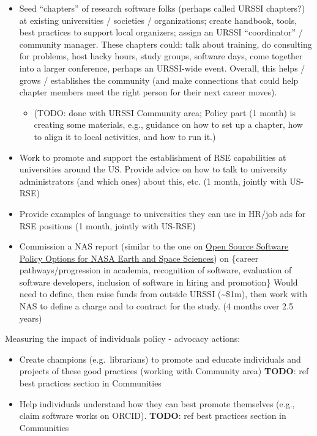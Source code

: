 \documentclass[
]{book}
\providecommand{\tightlist}{%
  \setlength{\itemsep}{0pt}\setlength{\parskip}{0pt}}
\begin{document}
\begin{itemize}
\item
  Seed ``chapters'' of research software folks (perhaps called URSSI chapters?) at existing
  universities / societies / organizations; create handbook, tools, best practices to support
  local organizers; assign an URSSI ``coordinator'' / community manager. These chapters could:
  talk about training, do consulting for problems, host hacky hours, study groups, software days,
  come together into a larger conference, perhaps an URSSI-wide event. Overall, this
  helps / grows / establishes the community (and make connections that could help chapter members
  meet the right person for their next career moves).

  \begin{itemize}
  \tightlist
  \item
    (TODO: done with URSSI Community area; Policy part (1 month) is creating some materials,
    e.g., guidance on how to set up a chapter, how to align it to local activities, and how to run it.)
  \end{itemize}
\item
  Work to promote and support the establishment of RSE capabilities at universities around the US.
  Provide advice on how to talk to university administrators (and which ones) about this, etc. (1 month,
  jointly with US-RSE)
\item
  Provide examples of language to universities they can use in HR/job ads for RSE positions
  (1 month, jointly with US-RSE)
\item
  Commission a NAS report (similar to the one on \href{https://www.nap.edu/read/25217/chapter/1}{Open Source Software Policy Options for NASA
  Earth and Space Sciences}) on
  \{career pathways/progression in academia, recognition of software, evaluation of software developers,
  inclusion of software in hiring and promotion\} Would need to define, then raise funds from
  outside URSSI (\textasciitilde\$1m), then work with NAS to define a charge and to contract for the study.
  (4 months over 2.5 years)
\end{itemize}

Measuring the impact of individuals policy - advocacy actions:

\begin{itemize}
\item
  Create champions (e.g.~librarians) to promote and educate individuals and projects of these
  good practices (working with Community area) \textbf{TODO}: ref best practices section in Communities
\item
  Help individuals understand how they can best promote themselves (e.g., claim software works on
  ORCID). \textbf{TODO}: ref best practices section in Communities
\end{itemize}
\end{document}
